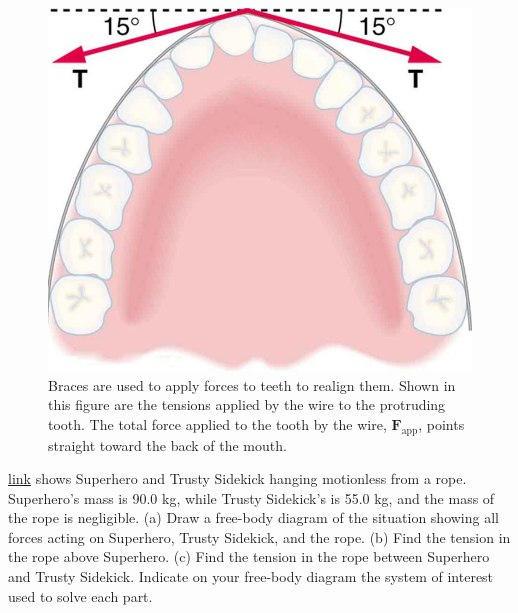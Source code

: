 \documentclass[
]{book}
\begin{document}
\begin{figure}
\hypertarget{import-auto-id1569692}{%
\centering
\includegraphics{images/Figure_04_06_07.jpg}
\caption{Braces are used to apply forces to teeth to realign them. Shown in
this figure are the tensions applied by the wire to the protruding
tooth. The total force applied to the tooth by the wire,
\(\textbf{F}_{\text{app}}{}\), points straight toward the back of the
mouth.}\label{import-auto-id1569692}
}
\end{figure}

\hypertarget{fs-id2686437}{}
\leavevmode{}%
\protect\hyperlink{import-auto-id1655793}{link} shows Superhero
and Trusty Sidekick hanging motionless from a rope. Superhero's mass is
90.0 kg, while Trusty Sidekick's is 55.0 kg, and the mass of the rope is
negligible. (a) Draw a free-body diagram of the situation showing all
forces acting on Superhero, Trusty Sidekick, and the rope. (b) Find the
tension in the rope above Superhero. (c) Find the tension in the rope
between Superhero and Trusty Sidekick. Indicate on your free-body
diagram the system of interest used to solve each part.
\end{document}
